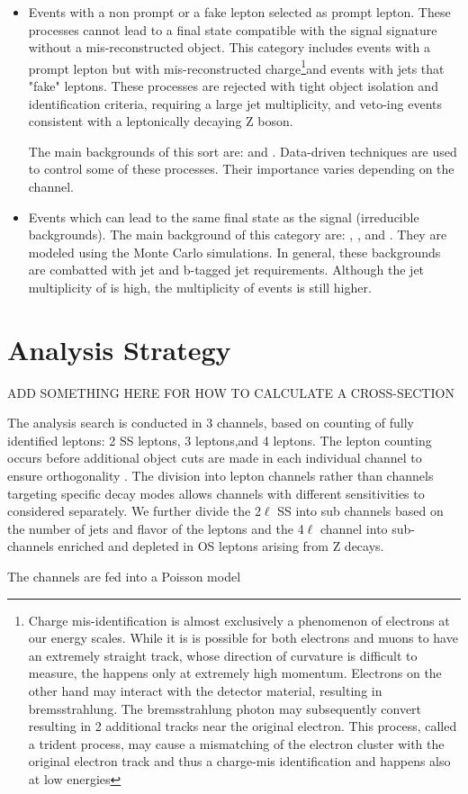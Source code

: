 \begin{itemize}

\item Events with a non prompt or a fake lepton selected as prompt
  lepton. These processes cannot lead to a final state compatible with the
  signal signature without a mis-reconstructed object. This category includes
  events with a prompt lepton but with mis-reconstructed charge\footnote{Charge mis-identification is almost exclusively a phenomenon of electrons at our energy scales. While it is
  is possible for both electrons and muons to have an extremely straight track, whose direction of curvature is difficult to measure, the happens only at extremely high momentum. 
  Electrons on the other hand may interact with the detector material, resulting in bremsstrahlung. The bremsstrahlung photon may subsequently convert resulting in 2 additional
  tracks near the original electron. This process, called a trident process, may cause a mismatching of the electron cluster with the original electron track and thus
  a charge-mis identification and happens also at low energies}and events
  with jets that "fake" leptons.  These processes are rejected with tight object isolation and identification criteria, requiring a large jet multiplicity, and veto-ing events
  consistent with a leptonically decaying Z boson. 

  The main backgrounds of this sort are: \ttbar and \zj.
  Data-driven techniques are used to control some of these processes.
  Their importance varies depending on the channel.

\item Events which can lead to the same final state as the signal (irreducible
  backgrounds).
 The main background of this category are: \ttV, \WZ, and \ZZ.
 They are modeled using the Monte Carlo simulations. In general,
 these backgrounds are combatted with jet and b-tagged jet requirements. 
 Although the jet multiplicity of \ttV is high, the multiplicity of \tth 
 events is still higher. 

\end{itemize}


\section{Analysis Strategy} 


ADD SOMETHING HERE FOR HOW TO CALCULATE A CROSS-SECTION

The analysis search is conducted in 3 channels, based on counting of fully identified
leptons: 2 SS leptons, 3 leptons,and 4 leptons. The lepton counting occurs before additional object cuts are made in each individual 
channel to ensure orthogonality . The division into lepton channels rather than channels targeting specific decay modes
allows channels with different sensitivities to considered separately. We further divide the 2$\ell$ SS into sub channels
based on the number of jets and flavor of the leptons and the 4$\ell$ channel into sub-channels enriched and depleted in OS leptons arising from Z decays. 

The channels are fed into a Poisson model 



